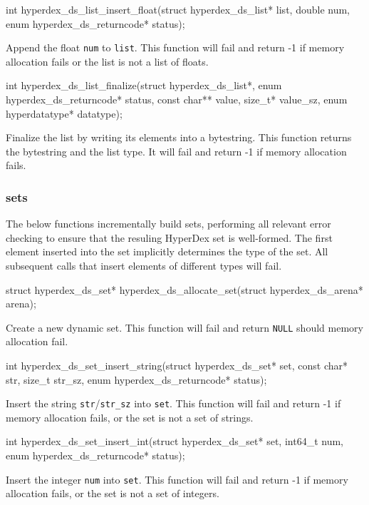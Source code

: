 \funcsep
\begin{ccode}
int hyperdex_ds_list_insert_float(struct hyperdex_ds_list* list, double num,
                                  enum hyperdex_ds_returncode* status);
\end{ccode}
\funcdesc Append the float \texttt{num} to \texttt{list}.  This function will
fail and return -1 if memory allocation fails or the list is not a list of
floats.

\funcsep
\begin{ccode}
int hyperdex_ds_list_finalize(struct hyperdex_ds_list*,
                              enum hyperdex_ds_returncode* status,
                              const char** value, size_t* value_sz,
                              enum hyperdatatype* datatype);
\end{ccode}
\funcdesc Finalize the list by writing its elements into a bytestring.  This
function returns the bytestring and the list type.  It will fail and return -1
if memory allocation fails.

\subsubsection{sets}

The below functions incrementally build sets, performing all relevant error
checking to ensure that the resuling HyperDex set is well-formed.  The first
element inserted into the set implicitly determines the type of the set.  All
subsequent calls that insert elements of different types will fail.

\begin{ccode}
struct hyperdex_ds_set* hyperdex_ds_allocate_set(struct hyperdex_ds_arena* arena);
\end{ccode}
\funcdesc Create a new dynamic set.  This function will fail and return
\texttt{NULL} should memory allocation fail.

\funcsep
\begin{ccode}
int hyperdex_ds_set_insert_string(struct hyperdex_ds_set* set,
                                  const char* str, size_t str_sz,
                                  enum hyperdex_ds_returncode* status);
\end{ccode}
\funcdesc Insert the string \texttt{str}/\texttt{str\_sz} into \texttt{set}.
This function will fail and return -1 if memory allocation fails, or the set is
not a set of strings.

\funcsep
\begin{ccode}
int hyperdex_ds_set_insert_int(struct hyperdex_ds_set* set, int64_t num,
                               enum hyperdex_ds_returncode* status);
\end{ccode}
\funcdesc Insert the integer \texttt{num} into \texttt{set}.  This function will
fail and return -1 if memory allocation fails, or the set is not a set of
integers.

